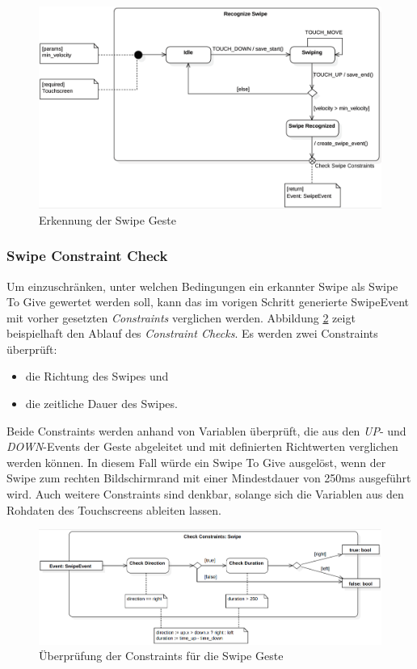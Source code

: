 {\begin{figure}[h]
\includegraphics[width=\textwidth]{swipe_recognize.png}
\caption{Erkennung der Swipe Geste}
\label{recognize_swipe}
\end{figure}

\subsubsection*{Swipe Constraint Check}
Um einzuschränken, unter welchen Bedingungen ein erkannter Swipe als Swipe To Give gewertet werden soll, kann das im vorigen Schritt generierte SwipeEvent mit vorher gesetzten \textit{Constraints} verglichen werden. Abbildung \ref{check_constraints} zeigt beispielhaft den Ablauf des \textit{Constraint Checks}. Es werden zwei Constraints überprüft:
\begin{itemize}
\item die Richtung des Swipes und
\item die zeitliche Dauer des Swipes.
\end{itemize}
Beide Constraints werden anhand von Variablen überprüft, die aus den \textit{UP}- und \textit{DOWN}-Events der Geste abgeleitet und mit definierten Richtwerten verglichen werden können. In diesem Fall würde ein Swipe To Give ausgelöst, wenn der Swipe zum rechten Bildschirmrand mit einer Mindestdauer von 250ms ausgeführt wird. Auch weitere Constraints sind denkbar, solange sich die Variablen aus den Rohdaten des Touchscreens ableiten lassen.

\begin{figure}[h]
\includegraphics[width=\textwidth]{swipe_check_constraints.png}
\caption{Überprüfung der Constraints für die Swipe Geste}
\label{check_constraints}
\end{figure}

}
